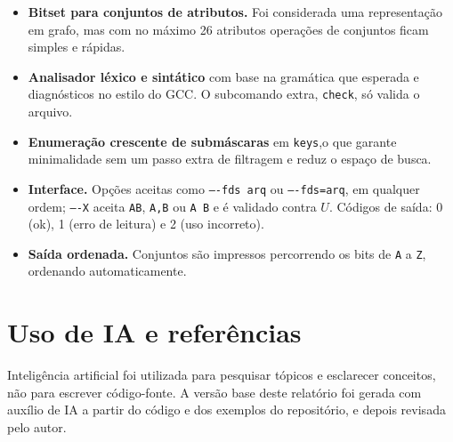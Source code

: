 \documentclass[11pt,a4paper]{article}
\newcommand{\cmd}[1]{\texttt{#1}}
\begin{document}
\begin{itemize}
    \item \textbf{Bitset para conjuntos de atributos.} Foi considerada uma
        representação em grafo, mas com no máximo 26 atributos operações de
        conjuntos ficam simples e rápidas.

    \item \textbf{Analisador léxico e sintático} com base na gramática que
        esperada e diagnósticos no estilo do GCC. O subcomando extra,
        \cmd{check}, só valida o arquivo.

    \item \textbf{Enumeração crescente de submáscaras} em \cmd{keys},o que
        garante minimalidade sem um passo extra de filtragem e reduz o espaço
        de busca.

    \item \textbf{Interface.} Opções aceitas como \texttt{----fds arq} ou
        \texttt{----fds=arq}, em qualquer ordem; \texttt{----X} aceita \texttt{AB},
        \texttt{A,B} ou \texttt{A B} e é validado contra $U$. Códigos de saída:
        0 (ok), 1 (erro de leitura) e 2 (uso incorreto).

    \item \textbf{Saída ordenada.} Conjuntos são impressos percorrendo os bits
        de \texttt{A} a \texttt{Z}, ordenando automaticamente.
\end{itemize}





\section{Uso de IA e referências}

Inteligência artificial foi utilizada para pesquisar tópicos e esclarecer conceitos, não
para escrever código-fonte. A versão base deste relatório foi gerada com auxílio de IA
a partir do código e dos exemplos do repositório, e depois revisada pelo autor.
\end{document}
